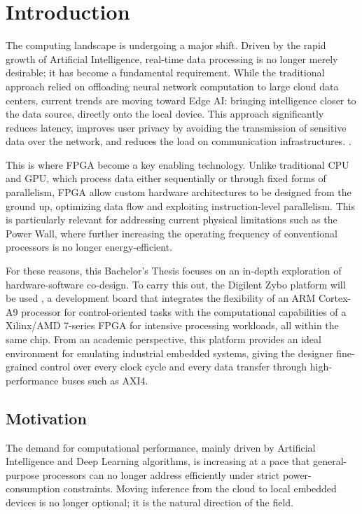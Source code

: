 \chapter*{Introduction}
\label{cap:introduction}

The computing landscape is undergoing a major shift. Driven by the rapid growth of
Artificial Intelligence, real-time data processing is no longer merely desirable; it
has become a fundamental requirement.
While the traditional approach relied on offloading neural network computation to
large cloud data centers, current trends are moving toward Edge AI: bringing
intelligence closer to the data source, directly onto the local device.
This approach significantly reduces latency, improves user privacy by avoiding the
transmission of sensitive data over the network, and reduces the load on communication
infrastructures. \citep{zhou2019edgeintelligencepavingmile}.

This is where \ac{FPGA} become a key enabling technology.
Unlike traditional \ac{CPU} and \ac{GPU}, which process data either sequentially or through
fixed forms of parallelism, \ac{FPGA} allow custom hardware architectures to be designed
from the ground up, optimizing data flow and exploiting instruction-level parallelism.
This is particularly relevant for addressing current physical limitations such as the
Power Wall, where further increasing the operating frequency of conventional processors
is no longer energy-efficient.
\citep{10.1145/3282307}

For these reasons, this Bachelor's Thesis focuses on an in-depth exploration of
hardware-software co-design.
To carry this out, the Digilent Zybo platform will be used \citep{digilentZyboOverview},
a development board that integrates the flexibility of an \ac{ARM} Cortex-A9 processor for
control-oriented tasks with the computational capabilities of a Xilinx/AMD 7-series
\ac{FPGA} for intensive processing workloads, all within the same chip. From an academic
perspective, this platform provides an ideal environment for emulating industrial
embedded systems, giving the designer fine-grained control over every clock cycle and
every data transfer through high-performance buses such as AXI4.

\section*{Motivation}
The demand for computational performance, mainly driven by Artificial Intelligence and
Deep Learning algorithms, is increasing at a pace that general-purpose processors can
no longer address efficiently under strict power-consumption constraints. Moving
inference from the cloud to local embedded devices is no longer optional; it is the
natural direction of the field.

